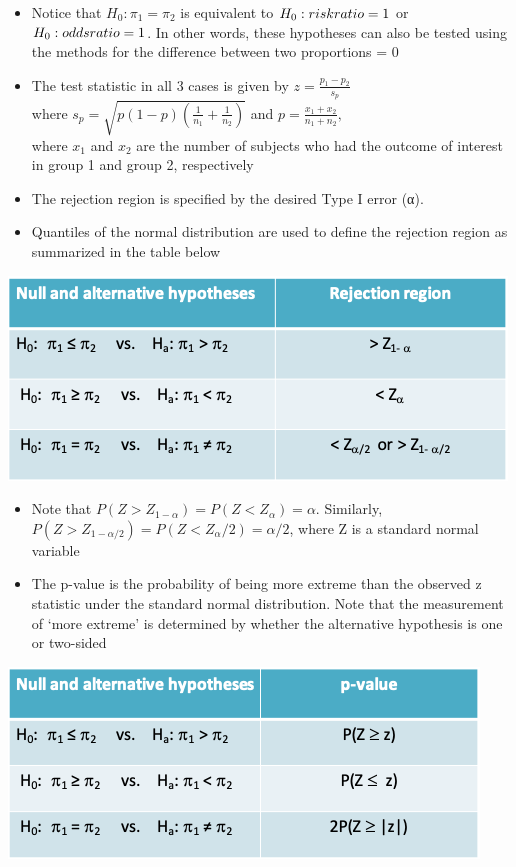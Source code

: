 \documentclass[
]{book}
\providecommand{\tightlist}{%
  \setlength{\itemsep}{0pt}\setlength{\parskip}{0pt}}
\begin{document}
\begin{itemize}
\item
  Notice that \(H_0:\pi_1=\pi_2\) is equivalent to \(H_0:risk\space ratio=1\) or \(H_0:odds\space ratio=1\). In other words, these hypotheses can also be tested using the methods for the difference between two proportions = 0
\item
  The test statistic in all 3 cases is given by \(z=\frac{p_1-p_2}{s_p}\)\\
  where \(s_p=\sqrt{p(1-p)\left(\frac{1}{n_1}+\frac{1}{n_2}\right)}\) and \(p=\frac{x_1+x_2}{n_1+n_2},\)\\
  where \(x_1\) and \(x_2\) are the number of subjects who had the outcome of interest in group 1 and group 2, respectively
\item
  The rejection region is specified by the desired Type I error (α).
\item
  Quantiles of the normal distribution are used to define the rejection region as summarized in the table below
\end{itemize}

\includegraphics[width=0.7\linewidth]{./7_48}

\begin{itemize}
\tightlist
\item
  Note that \(P(Z>Z_{1-\alpha})=P(Z<Z_\alpha)=\alpha\). Similarly, \(P(Z>Z_{1-\alpha/2})=P(Z<Z_\alpha/2)=\alpha/2\), where Z is a standard normal variable
\item
  The p-value is the probability of being more extreme than the observed z statistic under the standard normal distribution. Note that the measurement of `more extreme' is determined by whether the alternative hypothesis is one or two-sided
\end{itemize}

\includegraphics[width=0.7\linewidth]{./7_49}
\end{document}
